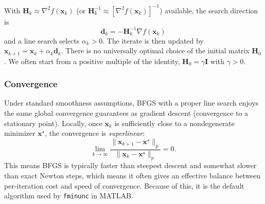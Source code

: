 With \(\mathbf{H}_k \approx \nabla^2 f(\mathbf{x}_k)\) (or \(\mathbf{H}_k^{-1} \approx [\nabla^2 f(\mathbf{x}_k)]^{-1}\)) available, the search direction is
\begin{equation}
\mathbf{d}_k = -\mathbf{H}_k^{-1}\nabla f(\mathbf{x}_k)
\end{equation}
and a line search selects \(\alpha_k>0\). The iterate is then updated by \(\mathbf{x}_{k+1}=\mathbf{x}_k+\alpha_k\mathbf{d}_k\). There is no universally optimal choice of the initial matrix \(\mathbf{H}_0\). We often start from a positive multiple of the identity, \(\mathbf{H}_0=\gamma\mathbf{I}\) with \(\gamma>0\).

\subsubsection{Convergence}
Under standard smoothness assumptions, BFGS with a proper line search enjoys the same global convergence guarantees as gradient descent (convergence to a stationary point). Locally, once \(\mathbf{x}_k\) is sufficiently close to a nondegenerate minimizer \(\mathbf{x}^\star\), the convergence is \emph{superlinear}:
\begin{equation}
\lim_{k\to\infty}
\frac{\|\mathbf{x}_{k+1}-\mathbf{x}^\star\|_p}{\|\mathbf{x}_k-\mathbf{x}^\star\|_p}=0.
\end{equation}
This means BFGS is typically faster than steepest descent and somewhat slower than exact Newton steps, which means it often gives an effective balance between per-iteration cost and speed of convergence. Because of this, it is the default algorithm used by \texttt{fminunc} in MATLAB.



